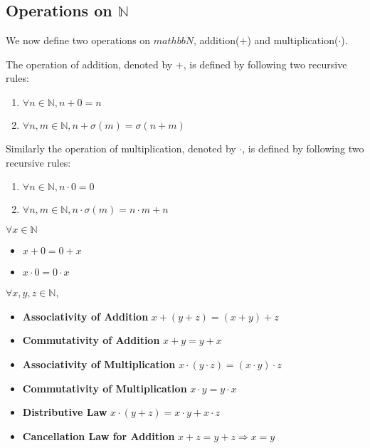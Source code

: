 \documentclass{report}
\begin{document}
		\subsection{Operations on $\mathbb{N}$}
		We now define two operations on $mathbb{N}$, addition($+$) and multiplication($\cdot$).
		
		\begin{defn} \label{def_add_mult_N}
			The operation of addition, denoted by $+$, is defined by following two recursive rules:
			\begin{enumerate}
				\item $\forall n \in \mathbb{N}, n+0=n$
				\item $\forall n,m \in \mathbb{N}, n+\sigma(m)=\sigma(n+m)$
			\end{enumerate}
			Similarly the operation of multiplication, denoted by $\cdot$, is defined by following two recursive rules:
			\begin{enumerate}
				\item $\forall n \in \mathbb{N}, n \cdot 0=0$
				\item $\forall n,m \in \mathbb{N}, n \cdot \sigma(m)=n \cdot m+n$
			\end{enumerate}
		\end{defn}
		
		\begin{lemma}[Operations on $0$] \label{thm_n_op_on_0}
			$\forall x \in \mathbb{N}$
			\begin{itemize}
				\item $x+0=0+x$
				\item $x \cdot 0=0 \cdot x$
			\end{itemize}
		\end{lemma}
		
		\begin{prop} \label{thm_property_operation_N}
			$\forall x,y,z \in \mathbb{N}$,
			\begin{itemize}
				\item \textbf{Associativity of Addition} $x+(y+z)=(x+y)+z$
				\item \textbf{Commutativity of Addition} $x+y=y+x$
				\item \textbf{Associativity of Multiplication} $x \cdot (y \cdot z)=(x \cdot y) \cdot z$
				\item \textbf{Commutativity of Multiplication} $x \cdot y=y \cdot x$
				\item \textbf{Distributive Law} $x \cdot (y+z)=x \cdot y+x \cdot z$
				\item \textbf{Cancellation Law for Addition} $x+z=y+z \Rightarrow x=y$
			\end{itemize}
		\end{prop}
		
\end{document}
